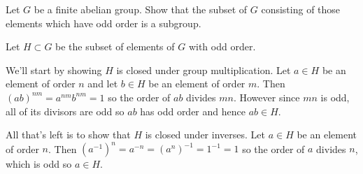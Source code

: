 \begin{problem}
Let $G$ be a finite abelian group. Show that the subset of $G$ consisting of those elements which have odd order is a subgroup.
\end{problem}

Let $H\subset G$ be the subset of elements of $G$ with odd order. 

We'll start by showing $H$ is closed under group multiplication. Let $a\in H$ be an element of order $n$ and let $b\in H$ be an element of order $m$. Then $(ab)^{nm}=a^{nm}b^{nm}=1$ so the order of $ab$ divides $mn$. However since $mn$ is odd, all of its divisors are odd so $ab$ has odd order and hence $ab\in H$.

All that's left is to show that $H$ is closed under inverses. Let $a\in H$ be an element of order $n$. Then $(a^{-1})^n=a^{-n}=(a^n)^{-1}=1^{-1}=1$ so the order of $a$ divides $n$, which is odd so $a\in H$.    